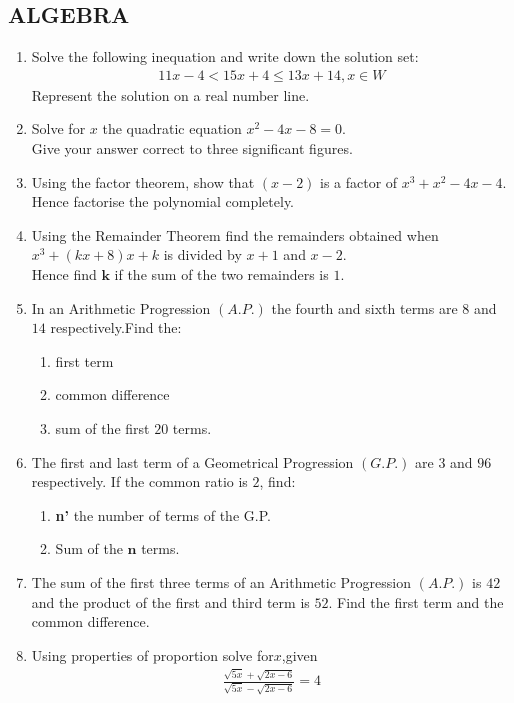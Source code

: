 \documentclass[12pt,-letter paper]{article}
\providecommand{\brak}[1]{\ensuremath{\left(#1\right)}}
\begin{document}
\begin{center}
    \section*{ALGEBRA}
\end{center}
\begin{enumerate}
\item Solve the following inequation and write down the solution set:\\
\begin{align}	
      11x-4<15x+4 \leq 13x+14,x\in W
\end{align}
\text Represent the solution on a real number line.
\item Solve for $x$ the quadratic equation $x^2 - 4x-8 = 0$.\\
Give your answer correct to three significant figures.
\item Using the factor theorem, show that \brak{x-2} is a factor of $ x^3+x^2-4x-4$.\\
	Hence factorise the polynomial completely.
\item Using the Remainder Theorem find the remainders obtained when $x^3+\brak{kx+8}x+k$ is divided by $x+1$ and $x-2$.\\
Hence find $\textbf{k}$ if the sum of the two remainders is $1$.
\item In an Arithmetic Progression \brak{A.P.} the fourth and sixth terms are $8$ and $14$ respectively.Find the:
	\begin{enumerate}
	\item first term 
	\item common difference
	\item sum of the first $20$ terms.
	\end{enumerate}
\item The first and last term of a Geometrical Progression \brak{G.P.} are $3$ and $96$ respectively. If the common ratio is $2$, find:
\begin{enumerate}
    \item \textbf{n'} the number of terms of the G.P.
    \item Sum of the $\textbf{n}$ terms.
\end{enumerate}
\item The sum of the first three terms of an Arithmetic Progression \brak{A.P.} is $42$ and the product of the first and third term is $52$. Find the first term and the common difference. 
  
\item Using properties of proportion solve for$x$,given
\begin{align}
    \frac{\sqrt{5x}+\sqrt{2x-6}}{\sqrt{5x}-\sqrt{2x-6}}=4
\end{align}


\end{enumerate}
\end{document}
